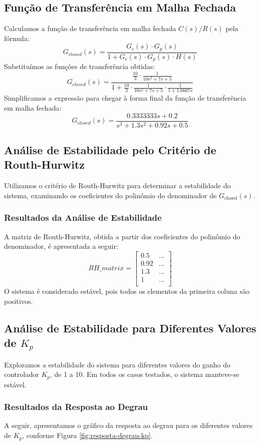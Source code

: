 \subsection{Função de Transferência em Malha Fechada}
Calculamos a função de transferência em malha fechada \( C(s)/R(s) \) pela fórmula:
\[
    G_{closed}(s) = \frac{G_c(s) \cdot G_p(s)}{1 + G_c(s) \cdot G_p(s) \cdot H(s)}
\]
Substituímos as funções de transferência obtidas:
\[
    G_{closed}(s) = \frac{\frac{10}{3} \cdot \frac{1}{10 s^2 + 7 s + 5}}{1 + \frac{10}{3} \cdot \frac{1}{10 s^2 + 7 s + 5} \cdot \frac{1}{1 + 1.6667 s}}
\]
Simplificamos a expressão para chegar à forma final da função de transferência em malha fechada:
\[
    G_{closed}(s) = \frac{0.3333333s + 0.2}{s^3 + 1.3s^2 + 0.92s + 0.5}
\]

\subsection{Análise de Estabilidade pelo Critério de Routh-Hurwitz}
Utilizamos o critério de Routh-Hurwitz para determinar a estabilidade do sistema, examinando os coeficientes do polinômio do denominador de \( G_{\text{closed}}(s) \).

\subsubsection{Resultados da Análise de Estabilidade}
A matriz de Routh-Hurwitz, obtida a partir dos coeficientes do polinômio do denominador, é apresentada a seguir:
\[
    RH\_matrix = \begin{bmatrix}
        0.5  & ... \\
        0.92 & ... \\
        1.3  & ... \\
        1    & ... \\
    \end{bmatrix}
\]
O sistema é considerado estável, pois todos os elementos da primeira coluna são positivos.

\subsection{Análise de Estabilidade para Diferentes Valores de \( K_p \)}
Exploramos a estabilidade do sistema para diferentes valores do ganho do controlador \( K_p \), de 1 a 10. Em todos os casos testados, o sistema manteve-se estável.

\subsubsection{Resultados da Resposta ao Degrau}
A seguir, apresentamos o gráfico da resposta ao degrau para os diferentes valores de \( K_p \), conforme Figura \ref{fig:resposta-degrau-kp}.

